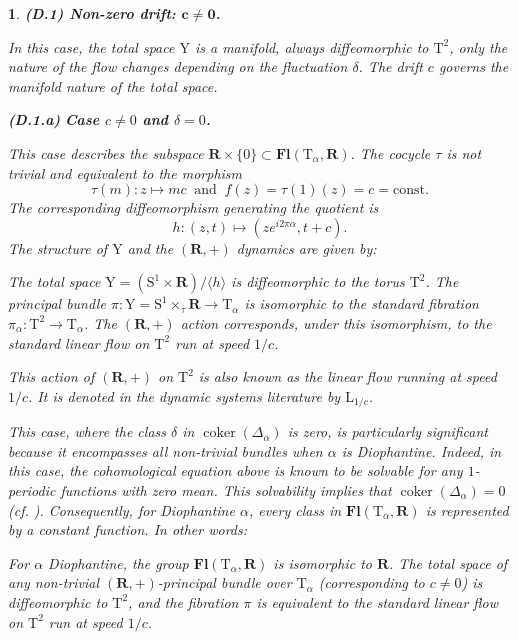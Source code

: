 \documentclass[10pt,letterpaper,reqno]{amsart}
\theoremstyle{article}
\newtheorem{article}[subsection]{}
\newenvironment{proposition*}{\textbf{Proposition.}\it}{}
\newenvironment{theorem*}{\textbf{Theorem.}\it}{}
\newcommand{\1}{{\hat 1}}
\newcommand{\0}{{\hat 0}}
\newcommand{\RR}{\mathbf R}
\def \L{\mathrm L}
\def \S{\mathrm S}
\def \T{\mathrm T}
\def \Y{\mathrm Y}
\newcommand{\coker}{\operatorname{coker}}
\DeclareMathOperator{\Fb}{\boldsymbol{\mathsf{Fl}}}
\renewcommand{\Fb}{\mathbf{Fl}}
\def \L{\mathrm L}
\begin{document}
\begin{article}
    \medskip\textbf{(D.1) Non-zero drift: $\mathbf{c \neq 0}$.}
    
    In this case,
    the total space $\Y$ is a manifold,
    always diffeomorphic to $\T^2$,
    only the nature of the flow changes depending on the fluctuation $\delta$.
    The drift $c$ governs the manifold nature of the total space.
    
    \smallskip\textbf{(D.1.a)} \textbf{Case $c \ne 0$ and $\delta = 0$.}
    
    This case describes the subspace $\RR \times \{0\} \subset \Fb(\T_\alpha, \RR)$.
    The cocycle $\tau$ is not trivial and equivalent to the morphism
    $$
      \tau(m) : z \mapsto mc
      \ \text{ and } \
      f(z) = \tau(1)(z) = c = \text{const}.
      $$
    The corresponding diffeomorphism generating the quotient is
    $$
      h: (z,t) \mapsto \left(z e^{i 2\pi \alpha}, t + c\right).
      $$
    The structure of $\Y$ and the $(\RR,+)$ dynamics are given by:
    
    \begin{proposition*}
      The total space $\Y = (\S^1 \times \RR) / \langle h \rangle$ is diffeomorphic to the torus $\T^2$.
      The principal bundle $\pi : \Y = \S^1 \times_\tau \RR \to \T_\alpha$ is isomorphic to the standard fibration $\pi_\alpha : \T^2 \to \T_\alpha$.
      The $(\RR,+)$ action corresponds,
      under this isomorphism,
      to the standard linear flow on $\T^2$ run at speed $1/c$.
    \end{proposition*}
    
    This action of $(\RR,+)$ on $\T^2$ is also known as the linear flow running at speed $1/c$.
    It is denoted in the dynamic systems literature by $\L_{1/c}$.
    
    This case,
    where the class $\delta$ in $\coker(\Delta_\alpha)$ is zero,
    is particularly significant because it encompasses \emph{all} non-trivial bundles when $\alpha$ is Diophantine.
    Indeed,
    in this case,
    the cohomological equation above is known to be solvable for any $1$-periodic functions with zero mean.
    This solvability implies that $\coker(\Delta_\alpha) = 0$ (cf. \cite[Thm. 12.2.2]{KH95}).
    Consequently,
    for Diophantine $\alpha$,
    every class in $\Fb(\T_\alpha, \RR)$ is represented by a constant function.
    In other words:
    
    \begin{theorem*}
      For $\alpha$ Diophantine,
      the group $\Fb(\T_\alpha,\RR)$ is isomorphic to $\RR$.
      The total space of any non-trivial $(\RR,+)$-principal bundle over $\T_\alpha$ (corresponding to $c \neq 0$) is diffeomorphic to $\T^2$,
      and the fibration $\pi$ is equivalent to the standard linear flow on $\T^2$ run at speed $1/c$.
    \end{theorem*}
    

\end{article}
\end{document}
